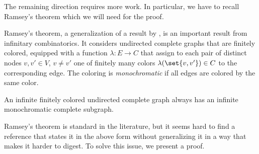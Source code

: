 \documentclass[../../diss.tex]{subfiles}
\begin{document}
The remaining direction requires more work.
In particular, we have to recall Ramsey's theorem which we will need for the proof.

Ramsey's theorem, a generalization of a result by , is an important result from infinitary combinatorics.
It considers undirected complete graphs that are finitely colored, \ie equipped with a function $\lambda \colon E \to C$ that assign to each pair of distinct nodes $v,v' \in V$, $v \neq v'$ one of finitely many colors $\lambda(\set{v,v'}) \in C$ to the corresponding edge.
The coloring is \emph{monochromatic} if all edges are colored by the same color.

\begin{ntheorem}%
\label{Theorem:Ramsey}%
    An infinite finitely colored undirected complete graph always has an infinite monochromatic complete subgraph.
\end{ntheorem}

Ramsey's theorem is standard in the literature, but it seems hard to find a reference that states it in the above form without generalizing it in a way that makes it harder to digest.
To solve this issue, we present a proof.
\end{document}
